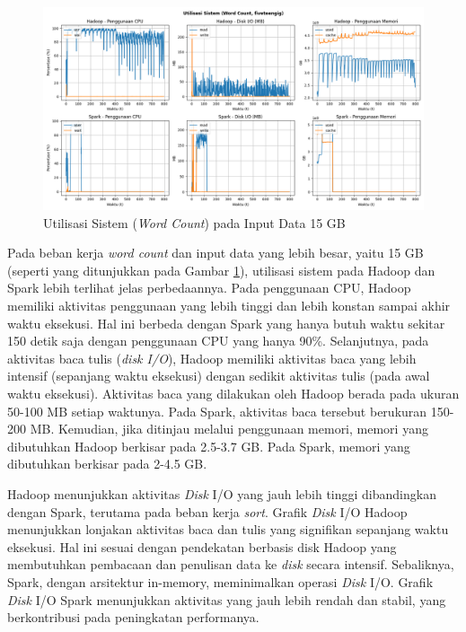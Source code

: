 \begin{figure}[h]
    \centering
    \includegraphics[width=1\textwidth]{figures/ch04/5-util-sistem-wordcount-fiveteengig}
    \caption{Utilisasi Sistem (\textit{Word Count}) pada Input Data 15 GB}
    \label{fig:5-util-sistem-wordcount-fiveteengig}
\end{figure}

Pada beban kerja \textit{word count} dan input data yang lebih besar, yaitu 15 GB (seperti yang ditunjukkan pada Gambar \ref{fig:5-util-sistem-wordcount-fiveteengig}), utilisasi sistem pada Hadoop dan Spark lebih terlihat jelas perbedaannya. Pada penggunaan CPU, Hadoop memiliki aktivitas penggunaan yang lebih tinggi dan lebih konstan sampai akhir waktu eksekusi. Hal ini berbeda dengan Spark yang hanya butuh waktu sekitar 150 detik saja dengan penggunaan CPU yang hanya 90\%. Selanjutnya, pada aktivitas baca tulis (\textit{disk I/O}), Hadoop memiliki aktivitas baca yang lebih intensif (sepanjang waktu eksekusi) dengan sedikit aktivitas tulis (pada awal waktu eksekusi). Aktivitas baca yang dilakukan oleh Hadoop berada pada ukuran 50-100 MB setiap waktunya. Pada Spark, aktivitas baca tersebut berukuran 150-200 MB. Kemudian, jika ditinjau melalui penggunaan memori, memori yang dibutuhkan Hadoop berkisar pada 2.5-3.7 GB. Pada Spark, memori yang dibutuhkan berkisar pada 2-4.5 GB.  

Hadoop menunjukkan aktivitas \textit{Disk} I/O yang jauh lebih tinggi dibandingkan dengan Spark, terutama pada beban kerja \textit{sort}. Grafik \textit{Disk} I/O Hadoop menunjukkan lonjakan aktivitas baca dan tulis yang signifikan sepanjang waktu eksekusi. Hal ini sesuai dengan pendekatan berbasis disk Hadoop yang membutuhkan pembacaan dan penulisan data ke \textit{disk} secara intensif. Sebaliknya, Spark, dengan arsitektur in-memory, meminimalkan operasi \textit{Disk} I/O. Grafik \textit{Disk} I/O Spark menunjukkan aktivitas yang jauh lebih rendah dan stabil, yang berkontribusi pada peningkatan performanya.

